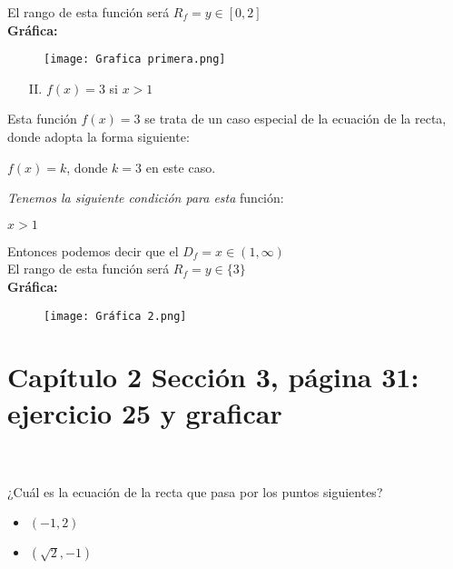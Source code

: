 \documentclass[12pt]{article}
\begin{document}
El rango de esta función será $R_f = y \in \left[0,2\right]$ \\

\textbf{Gráfica:}

\begin{figure}[htb] \centering \texttt{[image: Grafica primera.png]} \end{figure}
\newpage

\begin{enumerate}
    \item [II.] $f(x) = 3$ si $x>1$
\end{enumerate}

Esta función $f(x) = 3$  se trata de un caso especial de la ecuación de la recta, donde adopta la forma siguiente:
\begin{center}
$f(x)=k$, donde $k = 3$ en este caso.
\end{center}
\begin{center}
\textit{Tenemos la siguiente condición para esta} función:
\end{center}
\begin{center}
    $x>1$
\end{center}

Entonces podemos decir que el $D_f = x \in \left(1, \infty \right)$\\

El rango de esta función será $R_f = y \in \{3\}$ \\

\textbf{Gráfica:}

\begin{figure}[htb] \centering \texttt{[image: Gráfica 2.png]} \end{figure}

\newpage

\section{Capítulo 2 Sección 3, página 31: ejercicio 25 y graficar}\\\\

¿Cuál es la ecuación de la recta que pasa por los puntos siguientes?

\begin{itemize}
    \item $\left(-1,2\right)$
    \item $\left(\sqrt{2},-1\right)$
\end{itemize}
\end{document}
